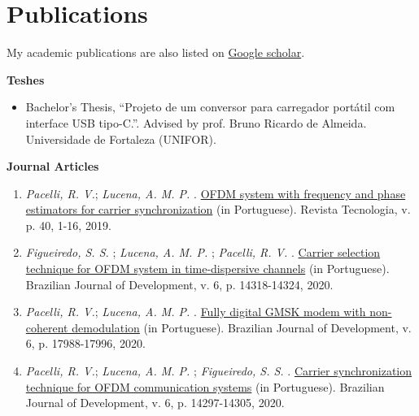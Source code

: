 \section{Publications}
My academic publications are also listed on \href{https://scholar.google.com.br/citations?user=Kj6Gzs4AAAAJ&hl=pt-BR&oi=sra}{Google scholar}.

\textbf{Teshes}
\begin{itemize}[label={-}]
    \item Bachelor's Thesis, ``Projeto de um conversor para carregador portátil com interface USB tipo-C.''. Advised by prof. Bruno Ricardo de Almeida. Universidade de Fortaleza (UNIFOR).
\end{itemize}

\textbf{Journal Articles}
\begin{enumerate}[label=\textbf{J\arabic*.}, align=left, leftmargin=1.5cm]
    \item \textit{Pacelli, R. V.}; \textit{Lucena, A. M. P.} . \href{https://periodicos.unifor.br/tec/article/view/7506/5991}{OFDM system with frequency and phase estimators for carrier synchronization} (in Portuguese). Revista Tecnologia, v. p. 40, 1-16, 2019.
    \item \textit{Figueiredo, S. S.} ; \textit{Lucena, A. M. P.} ; \textit{Pacelli, R. V.} . \href{https://www.brazilianjournals.com/index.php/BRJD/article/view/7946/6889}{Carrier selection technique for OFDM system in time-dispersive channels} (in Portuguese). Brazilian Journal of Development, v. 6, p. 14318-14324, 2020.
    \item \textit{Pacelli, R. V.}; \textit{Lucena, A. M. P.} . \href{https://www.brazilianjournals.com/index.php/BRJD/article/view/8538/7345}{Fully digital GMSK modem with non-coherent demodulation} (in Portuguese). Brazilian Journal of Development, v. 6, p. 17988-17996, 2020.
    \item \textit{Pacelli, R. V.}; \textit{Lucena, A. M. P.} ; \textit{Figueiredo, S. S.} . \href{https://www.brazilianjournals.com/index.php/BRJD/article/view/7944/6883}{Carrier synchronization technique for OFDM communication systems} (in Portuguese). Brazilian Journal of Development, v. 6, p. 14297-14305, 2020.
\end{enumerate}


